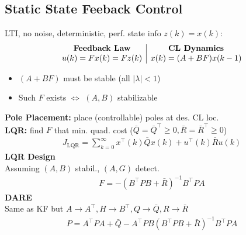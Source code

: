 \subsection{Static State Feeback Control}
LTI, no noise, deterministic, perf. state info $z(k)=x(k)$:
\begin{align*}
    \begin{array}{c | c}
        \textbf{Feedback Law} & \textbf{CL Dynamics} \\
        u(k) = Fx(k) = Fz(k) &  x(k) = (A+BF)x(k-1)
    \end{array}
\end{align*}
\begin{itemize}[leftmargin=1em]
    \item $(A+BF)$ must be stable (all $\lvert\lambda\rvert<1$)
    \item Such $F$ exists $\Leftrightarrow$ $(A,B)$ stabilizable
\end{itemize}
    
\textbf{Pole Placement:} place (controllable) poles at des. CL loc.\\
\textbf{LQR:} find $F$ that min. quad. cost ($\bar{Q} = \bar{Q}^\top \geq 0, \bar{R} = \bar{R}^\top \geq 0$)
\begin{align*}
    J_{\mathrm{LQR}} = \textstyle\sum_{k=0}^{\infty} x^\top(k)\bar{Q} x(k) + u^\top(k) \bar{R} u(k)
\end{align*}
\textbf{LQR Design}\\
Assuming $(A,B)$ stabil., $(A,G)$ detect.
\begin{align*}
    F = -(B^\top P B + \bar{R})^{-1} B^\top P A
\end{align*}
\textbf{DARE}\\
Same as KF but $A\to A^\top, H\to B^\top, Q \to \bar{Q}, R\to \bar{R}$
\begin{align*}
    P = A^\top P A + \bar{Q} - A^\top P B (B^\top P B + \bar{R})^{-1} B^\top P A
\end{align*}